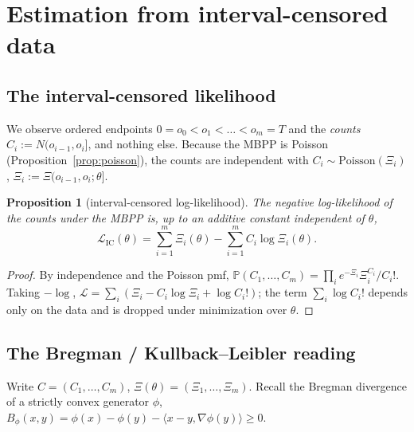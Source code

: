 \documentclass[11pt]{article}
\theoremstyle{plain}
\newtheorem{proposition}[theorem]{Proposition}
\theoremstyle{definition}
\theoremstyle{remark}
\newcommand{\Prob}{\mathbb{P}}\newcommand{\one}{\mathbf{1}}\newcommand{\dd}{\,\mathrm{d}}
\begin{document}
\section{Estimation from interval-censored data}
\label{sec:estim}

\subsection{The interval-censored likelihood}

We observe ordered endpoints $0=o_0<o_1<\dots<o_m=T$ and the \emph{counts}
$C_i:=N(o_{i-1},o_i]$, and nothing else. Because the MBPP is Poisson
(Proposition~\ref{prop:poisson}), the counts are independent with
$C_i\sim\mathrm{Poisson}(\Xi_i)$, $\Xi_i:=\Xi(o_{i-1},o_i;\theta]$.

\begin{proposition}[interval-censored log-likelihood]
\label{prop:icll}
The negative log-likelihood of the counts under the MBPP is, up to an additive
constant independent of $\theta$,
\begin{equation}
\mathcal L_{\mathrm{IC}}(\theta)=\sum_{i=1}^m\Xi_i(\theta)-\sum_{i=1}^m C_i\log\Xi_i(\theta).
\label{eq:icll}
\end{equation}
\end{proposition}
\begin{proof}
By independence and the Poisson pmf,
$\Prob(C_1,\dots,C_m)=\prod_i e^{-\Xi_i}\Xi_i^{C_i}/C_i!$. Taking $-\log$,
$\mathcal L=\sum_i(\Xi_i-C_i\log\Xi_i+\log C_i!)$; the term $\sum_i\log C_i!$
depends only on the data and is dropped under minimization over $\theta$.
\end{proof}

\subsection{The Bregman / Kullback--Leibler reading}

Write $C=(C_1,\dots,C_m)$, $\Xi(\theta)=(\Xi_1,\dots,\Xi_m)$. Recall the Bregman
divergence of a strictly convex generator $\phi$,
$B_\phi(x,y)=\phi(x)-\phi(y)-\langle x-y,\nabla\phi(y)\rangle\ge0$.
\end{document}
